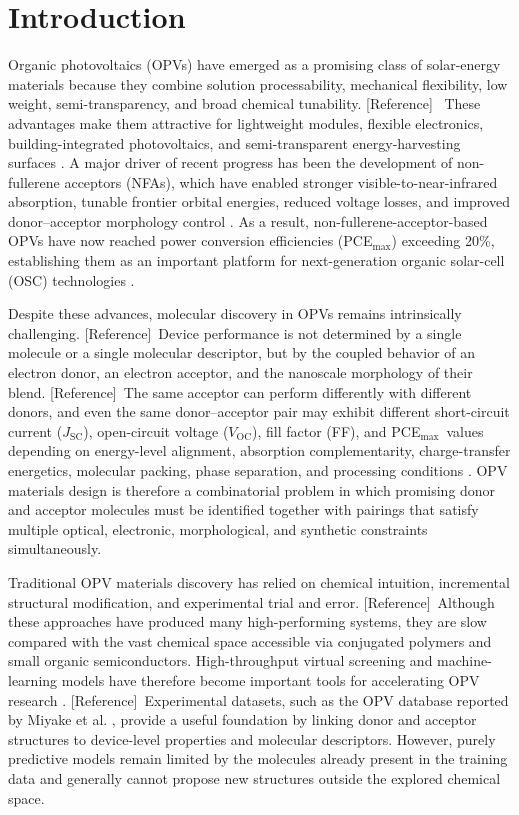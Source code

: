 \documentclass[12pt]{article}
\newcommand{\voc}{$V_\mathrm{OC}$}
\newcommand{\jsc}{$J_\mathrm{SC}$}
\newcommand{\pce}{PCE$_\mathrm{{max}}$}
\newcommand{\adref}{{\color{magenta}[Reference]}}
\begin{document}
\section{Introduction}
Organic photovoltaics (OPVs) have emerged as a promising class of solar-energy materials because they combine solution processability, mechanical flexibility, low weight, semi-transparency, and broad chemical tunability. \adref\ \cite{cartlidge2007bright, li2012polymer} These advantages make them attractive for lightweight modules, flexible electronics, building-integrated photovoltaics, and semi-transparent energy-harvesting surfaces \cite{hou2018organic,zhu2024progress}. A major driver of recent progress has been the development of non-fullerene acceptors (NFAs), which have enabled stronger visible-to-near-infrared absorption, tunable frontier orbital energies, reduced voltage losses, and improved donor--acceptor morphology control \cite{hou2018organic,wang2024physical}. As a result, non-fullerene-acceptor-based OPVs have now reached power conversion efficiencies (\pce) exceeding 20\%, establishing them as an important platform for next-generation organic solar-cell (OSC) technologies 
\cite{wang2024physical,zhu2024progress}.

Despite these advances, molecular discovery in OPVs remains intrinsically 
challenging. \cite{wu2020machine} \adref\ Device performance is not determined by a single molecule or a single molecular descriptor, but by the coupled behavior of an electron donor, an electron acceptor, and the nanoscale morphology of their blend. \cite{peng2023materials,wu2020machine} \adref\ The same acceptor can perform differently with different donors, and even the same donor--acceptor pair may exhibit different short-circuit current (\jsc), open-circuit voltage (\voc), fill factor (FF), and \pce\ values depending on energy-level alignment, absorption complementarity, charge-transfer energetics, molecular packing, phase separation, and processing conditions \cite{hou2018organic,zhu2024progress}. OPV materials design is therefore a combinatorial problem in which promising donor and acceptor molecules must be identified together with pairings that satisfy multiple optical, electronic, morphological, and synthetic constraints simultaneously.

Traditional OPV materials discovery has relied on chemical intuition, incremental structural modification, and experimental trial and error. \cite{wu2020machine,peng2023materials} \adref\ Although these approaches have produced many high-performing systems, they are slow compared with the vast chemical space accessible via conjugated polymers and small organic semiconductors. High-throughput virtual screening and machine-learning models have therefore become important tools for accelerating OPV research \cite{miyake2021machine,mahmood2021machine,hachmann2011harvard,wu2020machine}. \adref\ Experimental datasets, such as the OPV database reported by Miyake et al. \cite{miyake2021machine}, provide a useful foundation by linking donor and acceptor structures to device-level properties and molecular descriptors. However, purely predictive models remain limited by the molecules already present in the training data and generally cannot propose new structures outside the explored chemical space.
\end{document}
